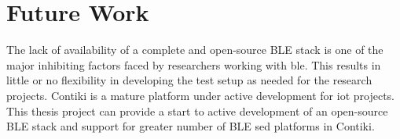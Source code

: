\section{Future Work}

The lack of availability of a complete and open-source BLE stack is one of the major inhibiting factors faced by researchers working with \gls{ble}. This results in little or no flexibility in developing the test setup as needed for the research projects. Contiki is a mature platform under active development for \gls{iot} projects. This thesis project can provide a start to active development of an open-source BLE stack and support for greater number of BLE sed platforms in Contiki.